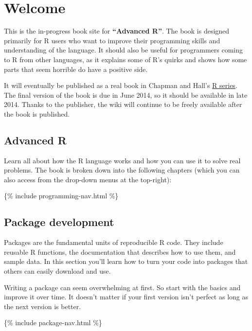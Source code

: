 \chapter{Welcome}

This is the in-progress book site for \textbf{``Advanced R''}. The book
is designed primarily for R users who want to improve their programming
skills and understanding of the language. It should also be useful for
programmers coming to R from other languages, as it explains some of R's
quirks and shows how some parts that seem horrible do have a positive
side.

It will eventually be published as a real book in Chapman and Hall's
\href{http://www.crcpress.com/browse/series/crctherser}{R series}. The
final version of the book is due in June 2014, so it should be available
in late 2014. Thanks to the publisher, the wiki will continue to be
freely available after the book is published.

\section{Advanced R}

Learn all about how the R language works and how you can use it to solve
real problems. The book is broken down into the following chapters
(which you can also access from the drop-down menus at the top-right):

\{\% include programming-nav.html \%\}

\section{Package development}

Packages are the fundamental units of reproducible R code. They include
reusable R functions, the documentation that describes how to use them,
and sample data. In this section you'll learn how to turn your code into
packages that others can easily download and use.

Writing a package can seem overwhelming at first. So start with the
basics and improve it over time. It doesn't matter if your first version
isn't perfect as long as the next version is better.

\{\% include package-nav.html \%\}
